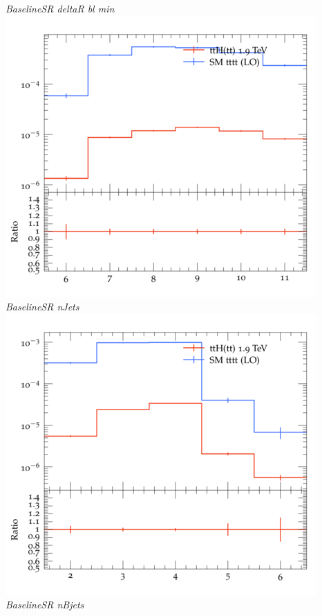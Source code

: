 \documentclass{beamer}
\begin{document}
\begin{frame}
\begin{columns}
\textit{\small BaselineSR deltaR bl min}
\includegraphics[width=\textwidth]{../plots/ttH_1900/tttt_ttH_1LOS/BaselineSR_nJets.png}\\
\textit{\small BaselineSR nJets}
\includegraphics[width=\textwidth]{../plots/ttH_1900/tttt_ttH_1LOS/BaselineSR_nBjets.png}\\
\textit{\small BaselineSR nBjets}
\end{columns}
\end{frame}
\end{document}
